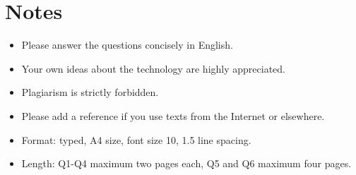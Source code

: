 \documentclass{article}
\begin{document}
\section*{Notes}

\begin{itemize}
\item Please answer the questions concisely in English.
\item Your own ideas about the technology are highly appreciated.
\item Plagiarism is strictly forbidden.
\item Please add a reference if you use texts from the Internet or elsewhere.
\item Format: typed, A4 size, font size 10, 1.5 line spacing.
\item Length: Q1-Q4 maximum two pages each, Q5 and Q6 maximum four pages.
\end{itemize}
\end{document}
